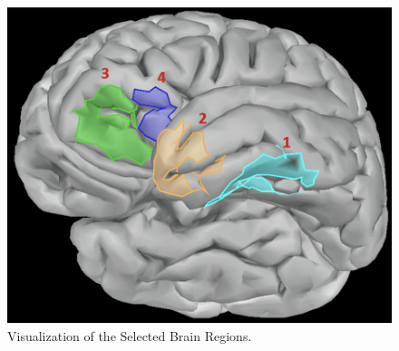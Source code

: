 \begin{figure}[!htb]
\caption{Visualization of the Selected Brain Regions.}
\label{experiment-2}
    \centering
    \includegraphics[width=\textwidth]{fig/experiment-2}
\end{figure}

